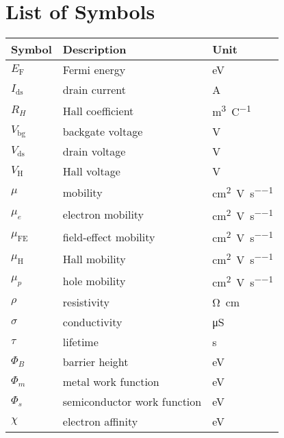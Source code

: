 \chapter*{List of Symbols}
\begin{longtable}[l]{p{125pt} p{150pt} p{150pt}} 
\toprule
\textbf{Symbol}	& \textbf{Description} & \textbf{Unit} \\ 
\midrule
$E_\mathrm{F}$  & Fermi energy & \si{\electronvolt}\\
$I_\mathrm{ds}$ & drain current & \si{\ampere}\\
$R_H$ & Hall coefficient & \si{\metre\cubed\per\coulomb}\\
$V_\mathrm{bg}$ & backgate voltage & \si{\volt}\\
$V_\mathrm{ds}$ & drain voltage & \si{\volt}\\
$V_\mathrm{H}$ & Hall voltage & \si{\volt}\\

$\mu$ & mobility & \si{\cm\squared\per\volt\per\second}\\
$\mu_e$ & electron mobility & \si{\cm\squared\per\volt\per\second}\\
$\mu_\mathrm{FE}$ & field-effect mobility & \si{\cm\squared\per\volt\per\second}\\
$\mu_\mathrm{H}$ & Hall mobility & \si{\cm\squared\per\volt\per\second}\\
$\mu_p$ & hole mobility & \si{\cm\squared\per\volt\per\second}\\
$\rho$ & resistivity & \si{\ohm\cm}\\
$\sigma$ & conductivity & \si{\micro\siemens} \\
$\tau$ & lifetime & \si{\second}\\
$\Phi_B$ & barrier height & \si{\electronvolt}\\
$\Phi_m$ & metal work function & \si{\electronvolt}\\
$\Phi_s$ & semiconductor work function & \si{\electronvolt}\\
$\chi$ & electron affinity & \si{\electronvolt}\\
\bottomrule
\end{longtable}


%
